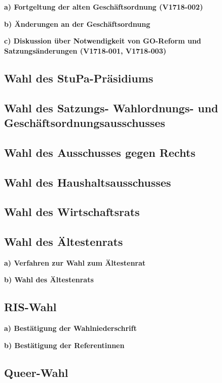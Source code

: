 \documentclass[ngerman,headheight=70pt]{scrartcl}
\begin{document}
        \textbf{a) Fortgeltung der alten Geschäftsordnung (V1718-002)}

        \textbf{b) Änderungen an der Geschäftsordnung}

        \textbf{c) Diskussion über Notwendigkeit von GO-Reform und
        Satzungsänderungen (V1718-001, V1718-003)}

    \subsection{Wahl des StuPa-Präsidiums}

    \subsection{Wahl des Satzungs- Wahlordnungs- und  Geschäftsordnungsausschusses}

    \subsection{Wahl des Ausschusses gegen Rechts}

    \subsection{Wahl des Haushaltsausschusses}

    \subsection{Wahl des Wirtschaftsrats}

    \subsection{Wahl des Ältestenrats}

        \textbf{a) Verfahren zur Wahl zum Ältestenrat}

        \textbf{b) Wahl des Ältestenrats}

    \subsection{RIS-Wahl}

        \textbf{a) Bestätigung der Wahlniederschrift}

        \textbf{b) Bestätigung der Referentinnen}

    \subsection{Queer-Wahl}
\end{document}
